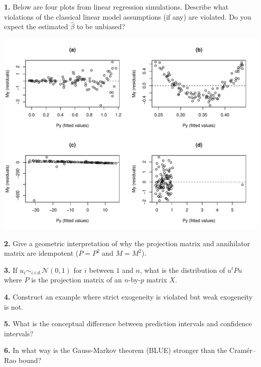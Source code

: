 \documentclass[12pt]{article}
\begin{document}
{\bf 1.} Below are four plots from linear regression simulations. Describe what
violations of the classical linear model assumptions (if any) are violated.
Do you expect the estimated $\widehat{\beta}$ to be unbiased?

\includegraphics[width=\textwidth]{fig01.pdf}

{\bf 2.} Give a geometric interpretation of why the projection matrix and
annihilator matrix are idempotent ($P = P^2$ and $M = M^2$).

{\bf 3.} If $u_i \sim_{i.i.d.} \mathcal{N} (0, 1)$ for $i$ between $1$ and
$n$, what is the distribution of $u^t P u$ where $P$ is the projection matrix
of an $n$-by-$p$ matrix $X$.

{\bf 4.} Construct an example where strict exogeneity is violated but weak
exogeneity is not.

{\bf 5.} What is the conceptual difference between prediction intervals and
confidence intervals?

{\bf 6.} In what way is the Gauss-Markov theorem (BLUE) stronger than the
Cramér–Rao bound?
\end{document}
